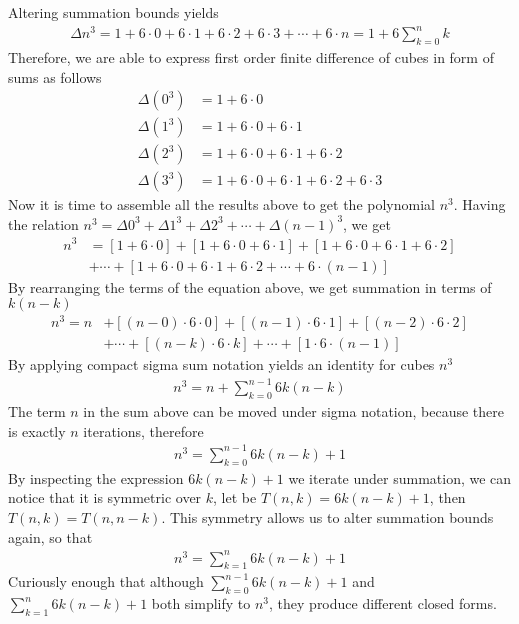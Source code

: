 Altering summation bounds yields
\begin{align*}
    \Delta n^3 = 1+6\cdot0+6\cdot1+6\cdot2+6\cdot3+\cdots+6\cdot n = 1 + 6 \sum_{k=0}^{n} k
\end{align*}
Therefore, we are able to express first order finite difference of cubes in form of sums as follows
\begin{align*}
    \Delta(0^3) &= 1+6 \cdot 0 \\
    \Delta(1^3) &= 1+6\cdot0+6\cdot1 \\
    \Delta(2^3) &= 1+6\cdot0+6\cdot1+6\cdot2 \\
    \Delta(3^3) &= 1+6\cdot0+6\cdot1+6\cdot2+6\cdot3
\end{align*}
Now it is time to assemble all the results above to get the polynomial $n^3$.
Having the relation $n^3 = \Delta 0^3 + \Delta 1^3 + \Delta 2^3 + \cdots + \Delta (n-1)^3$,
we get
\begin{align*}
    n^3 &= [1+6\cdot0]+[1+6\cdot0+6\cdot1]+[1+6\cdot0+6\cdot1+6\cdot2] \nonumber \\
    &+ \cdots + [1+6\cdot0+6\cdot1+6\cdot2+\cdots+6\cdot(n-1)]
\end{align*}
By rearranging the terms of the equation above, we get summation in terms of $k (n-k)$
\begin{align*}
    n^3 = n &+ [(n-0) \cdot 6 \cdot 0] + [(n-1)\cdot6\cdot1] + [(n-2)\cdot6\cdot2] \\
    &+ \cdots + [(n-k)\cdot 6 \cdot k] + \cdots + [1\cdot6\cdot(n-1)]
\end{align*}
By applying compact sigma sum notation yields an identity for cubes $n^3$
\begin{align*}
    n^3 = n + \sum_{k=0}^{n-1} 6k(n-k)
\end{align*}
The term $n$ in the sum above can be moved under sigma notation, because there is exactly $n$ iterations, therefore
\begin{align*}
    n^3 = \sum_{k=0}^{n-1} 6k(n-k) + 1
\end{align*}
By inspecting the expression $6k(n-k) + 1$ we iterate under summation,
we can notice that it is symmetric over $k$, let be $T(n,k) = 6k(n-k) + 1$, then $T(n,k) = T(n,n-k)$.
This symmetry allows us to alter summation bounds again, so that
\begin{align*}
    n^3 = \sum_{k=1}^{n} 6k(n-k) + 1
\end{align*}
Curiously enough that although $\sum_{k=0}^{n-1} 6k(n-k) + 1$ and $\sum_{k=1}^{n} 6k(n-k) + 1$ both simplify to $n^3$,
they produce different closed forms.
